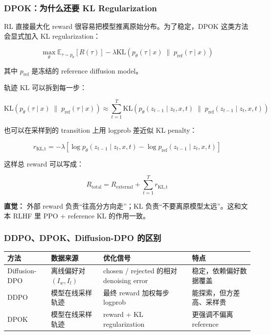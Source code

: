 \subsubsection{DPOK：为什么还要 KL Regularization}

RL 直接最大化 reward 很容易把模型推离原始分布。为了稳定，DPOK 这类方法会显式加入 KL regularization：

\[
\max_\theta
\mathbb{E}_{\tau\sim p_\theta}
\left[
R(\tau)
\right]
-
\lambda
\mathrm{KL}
\left(
p_\theta(\tau\mid x)
\;\|\;
p_\text{ref}(\tau\mid x)
\right)
\]

其中 $p_\text{ref}$ 是冻结的 reference diffusion model。

轨迹 KL 可以拆到每一步：

\[
\mathrm{KL}
\left(
p_\theta(\tau\mid x)
\;\|\;
p_\text{ref}(\tau\mid x)
\right)
\approx
\sum_{t=1}^{T}
\mathrm{KL}
\left(
p_\theta(z_{t-1}\mid z_t,x,t)
\;\|\;
p_\text{ref}(z_{t-1}\mid z_t,x,t)
\right)
\]

也可以在采样到的 transition 上用 logprob 差近似 KL penalty：

\[
r_\text{KL,t}
=
-
\lambda
\left[
\log p_\theta(z_{t-1}\mid z_t,x,t)
-
\log p_\text{ref}(z_{t-1}\mid z_t,x,t)
\right]
\]

这样总 reward 可以写成：

\[
R_\text{total}
=
R_\text{external}
+
\sum_{t=1}^{T}
r_\text{KL,t}
\]

\begin{intubox}
\textbf{直觉：} 外部 reward 负责“往高分方向走”；KL 负责“不要离原模型太远”。这和文本 RLHF 里 PPO + reference KL 的作用一致。
\end{intubox}

\subsubsection{DDPO、DPOK、Diffusion-DPO 的区别}

\begin{center}
{\small
\begin{tabular}{p{2.7cm}p{3.8cm}p{4cm}p{3.2cm}}
\hline
\textbf{方法} & \textbf{数据来源} & \textbf{优化信号} & \textbf{特点} \\
\hline
Diffusion-DPO
&
离线偏好对 $(I_w,I_l)$
&
chosen / rejected 的相对 denoising error
&
稳定，依赖偏好数据覆盖
\\
DDPO
&
模型在线采样轨迹
&
最终 reward 加权每步 logprob
&
能探索，但方差高、采样贵
\\
DPOK
&
模型在线采样轨迹
&
reward + KL regularization
&
更强调不偏离 reference
\\
\hline
\end{tabular}
}
\end{center}

